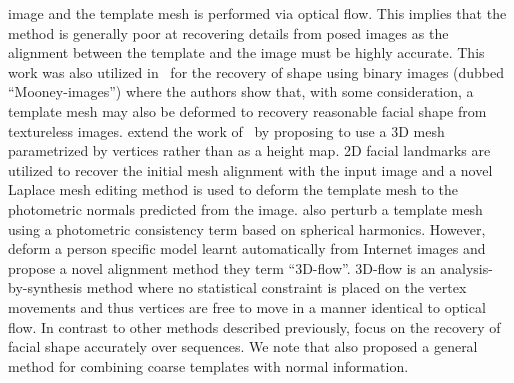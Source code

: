 image and the template mesh is performed via optical flow. This implies that the
method is generally poor at recovering details from posed images as the
alignment between the template and the image must be highly accurate. This work
was also utilized in~\cite{kemelmacher2008mooney} for the recovery of shape
using binary images (dubbed ``Mooney-images'') where the authors show that, with
some consideration, a template mesh may also be deformed to recovery reasonable
facial shape from textureless images.
\citet{roth2015unconstrained} extend the work of~\cite{kemelmacher2011facereconstruction}
by proposing to use a 3D mesh parametrized by vertices rather than as a height
map. 2D facial landmarks are utilized to recover the initial mesh alignment with
the input image and a novel Laplace mesh editing method is used to deform the
template mesh to the photometric normals predicted from the image.
\citet{Suwajanakorn:2014bl} also perturb a template mesh using a photometric
consistency term based on spherical harmonics.
However, \citet{Suwajanakorn:2014bl} deform a person
specific model learnt automatically from Internet images and propose a novel
alignment method they term ``3D-flow''. 3D-flow is an analysis-by-synthesis
method where no statistical constraint is placed on the vertex movements
and thus vertices are free to move in a manner identical to optical flow. In
contrast to other methods described previously, \citet{Suwajanakorn:2014bl}
focus on the recovery of facial shape accurately over sequences.
We note that \citet{nehab2005efficiently} also proposed a general method
for combining coarse templates with normal information.

